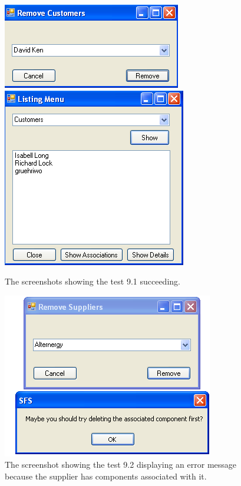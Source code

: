 \begin{figure}[ht]
\centering
\includegraphics[scale=0.5]{test9dot1scrot1}
\includegraphics[scale=0.5]{test9dot1scrot2}
\caption{The screenshots showing the test 9.1 succeeding.}
\label{fig:test_ninedotone}
\end{figure}

\begin{figure}[ht]
\centering
\includegraphics[scale=0.5]{test9dot2}
\caption{The screenshot showing the test 9.2 displaying an error message because the supplier has components associated with it.}
\label{fig:test_ninedottwo}
\end{figure}

